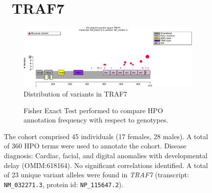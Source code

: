 \begin{figure}[htbp]
\section*{ TRAF7}
\centering
\begin{subfigure}[b]{0.95\textwidth}
\centering
\includegraphics[width=\textwidth]{ img/TRAF7_protein_diagram.pdf} 
\captionsetup{justification=raggedright,singlelinecheck=false}
\caption{Distribution of variants in TRAF7}
\end{subfigure}

\vspace{2em}

\begin{subfigure}[b]{0.95\textwidth}
\centering
{}
\captionsetup{justification=raggedright,singlelinecheck=false}
\caption{Fisher Exact Test performed to compare HPO annotation frequency with respect to genotypes.}
\end{subfigure}

\vspace{2em}

\caption{ The cohort comprised 45 individuals (17 females, 28 males). A total of 360 HPO terms were used to annotate the cohort. Disease diagnosis: Cardiac, facial, and digital anomalies with developmental delay (OMIM:618164). No significant correlations identified. A total of 23 unique variant alleles were found in \textit{TRAF7} (transcript: \texttt{NM\_032271.3}, protein id: \texttt{NP\_115647.2}).}
\end{figure}
